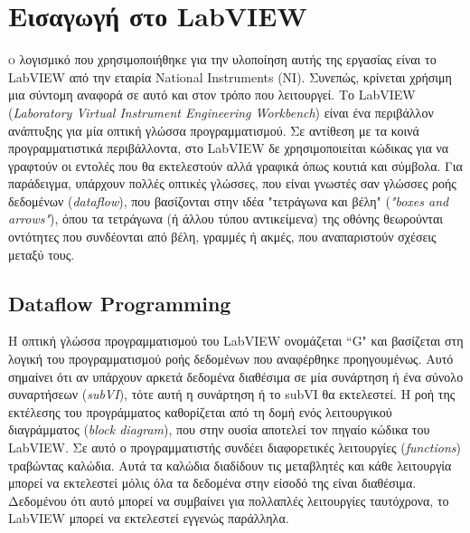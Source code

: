 


\section{Εισαγωγή στο LabVIEW}




\lettrine[findent=2pt]{}{ο} λογισμικό που χρησιμοποιήθηκε για την υλοποίηση αυτής της εργασίας είναι το LabVIEW από την εταιρία National Instruments (ΝΙ). Συνεπώς, κρίνεται χρήσιμη μια σύντομη αναφορά σε αυτό και στον τρόπο που λειτουργεί. 
Το LabVIEW (\emph{Laboratory Virtual Instrument Engineering Workbench}) είναι ένα περιβάλλον ανάπτυξης για μία οπτική γλώσσα προγραμματισμού. Σε αντίθεση με τα κοινά προγραμματιστικά περιβάλλοντα, στο LabVIEW δε χρησιμοποιείται κώδικας για να γραφτούν οι εντολές που θα εκτελεστούν αλλά γραφικά όπως κουτιά και σύμβολα. Για παράδειγμα, υπάρχουν πολλές οπτικές γλώσσες, που είναι γνωστές σαν γλώσσες ροής δεδομένων (\emph{dataflow}), που βασίζονται στην ιδέα "τετράγωνα και βέλη" (\emph{"boxes and arrows"}), όπου τα τετράγωνα (ή άλλου τύπου αντικείμενα) της οθόνης θεωρούνται οντότητες που συνδέονται από βέλη, γραμμές ή ακμές, που αναπαριστούν σχέσεις μεταξύ τους.

\subsection{Dataflow Programming}

Η οπτική γλώσσα προγραμματισμού του LabVIEW ονομάζεται ``G" και βασίζεται στη λογική του προγραμματισμού ροής δεδομένων που αναφέρθηκε προηγουμένως. Αυτό σημαίνει ότι αν υπάρχουν αρκετά δεδομένα διαθέσιμα σε μία συνάρτηση ή ένα σύνολο συναρτήσεων (\emph{subVI}), τότε αυτή η συνάρτηση ή το subVI θα εκτελεστεί. Η ροή της εκτέλεσης του προγράμματος καθορίζεται από τη δομή ενός λειτουργικού διαγράμματος (\emph{block diagram}), που στην ουσία αποτελεί τον πηγαίο κώδικα του LabVIEW. Σε αυτό ο προγραμματιστής συνδέει διαφορετικές λειτουργίες (\emph{functions}) τραβώντας καλώδια. Αυτά τα καλώδια διαδίδουν τις μεταβλητές και κάθε λειτουργία μπορεί να εκτελεστεί μόλις όλα τα δεδομένα στην είσοδό της είναι διαθέσιμα. Δεδομένου ότι αυτό μπορεί να συμβαίνει για πολλαπλές λειτουργίες ταυτόχρονα, το LabVIEW μπορεί να εκτελεστεί εγγενώς παράλληλα.

